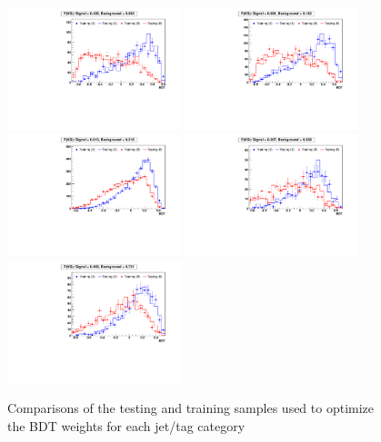 \begin{figure}[hbtp]
\begin{center}
   \includegraphics[width=0.45\textwidth]{Figures/Analysis_2_Diagrams/LJ_plots_lep/training/BDT_training_543.pdf}
   \includegraphics[width=0.45\textwidth]{Figures/Analysis_2_Diagrams/LJ_plots_lep/training/BDT_training_643.pdf}
   \includegraphics[width=0.45\textwidth]{Figures/Analysis_2_Diagrams/LJ_plots_lep/training/BDT_training_630000.pdf}
   \includegraphics[width=0.45\textwidth]{Figures/Analysis_2_Diagrams/LJ_plots_lep/training/BDT_training_540000.pdf}
   \includegraphics[width=0.45\textwidth]{Figures/Analysis_2_Diagrams/LJ_plots_lep/training/BDT_training_640203.pdf}
      \caption{Comparisons of the testing and training samples used to
      optimize the BDT weights for each jet/tag category}
   \label{fig:bdt_testTrain}
 \end{center}
\end{figure}


